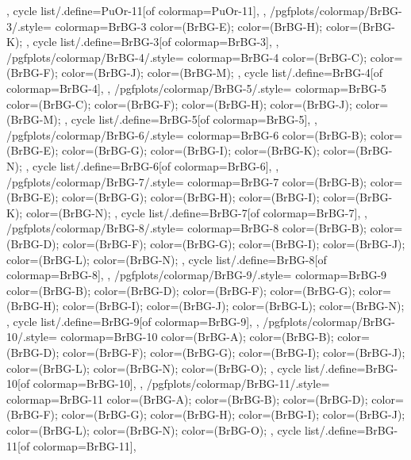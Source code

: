 {{{    },
    cycle list/.define={PuOr-11}{[of colormap=PuOr-11]},
  },
  /pgfplots/colormap/BrBG-3/.style={
    colormap={BrBG-3}{
      color=(BrBG-E);
      color=(BrBG-H);
      color=(BrBG-K);
    },
    cycle list/.define={BrBG-3}{[of colormap=BrBG-3]},
  },
  /pgfplots/colormap/BrBG-4/.style={
    colormap={BrBG-4}{
      color=(BrBG-C);
      color=(BrBG-F);
      color=(BrBG-J);
      color=(BrBG-M);
    },
    cycle list/.define={BrBG-4}{[of colormap=BrBG-4]},
  },
  /pgfplots/colormap/BrBG-5/.style={
    colormap={BrBG-5}{
      color=(BrBG-C);
      color=(BrBG-F);
      color=(BrBG-H);
      color=(BrBG-J);
      color=(BrBG-M);
    },
    cycle list/.define={BrBG-5}{[of colormap=BrBG-5]},
  },
  /pgfplots/colormap/BrBG-6/.style={
    colormap={BrBG-6}{
      color=(BrBG-B);
      color=(BrBG-E);
      color=(BrBG-G);
      color=(BrBG-I);
      color=(BrBG-K);
      color=(BrBG-N);
    },
    cycle list/.define={BrBG-6}{[of colormap=BrBG-6]},
  },
  /pgfplots/colormap/BrBG-7/.style={
    colormap={BrBG-7}{
      color=(BrBG-B);
      color=(BrBG-E);
      color=(BrBG-G);
      color=(BrBG-H);
      color=(BrBG-I);
      color=(BrBG-K);
      color=(BrBG-N);
    },
    cycle list/.define={BrBG-7}{[of colormap=BrBG-7]},
  },
  /pgfplots/colormap/BrBG-8/.style={
    colormap={BrBG-8}{
      color=(BrBG-B);
      color=(BrBG-D);
      color=(BrBG-F);
      color=(BrBG-G);
      color=(BrBG-I);
      color=(BrBG-J);
      color=(BrBG-L);
      color=(BrBG-N);
    },
    cycle list/.define={BrBG-8}{[of colormap=BrBG-8]},
  },
  /pgfplots/colormap/BrBG-9/.style={
    colormap={BrBG-9}{
      color=(BrBG-B);
      color=(BrBG-D);
      color=(BrBG-F);
      color=(BrBG-G);
      color=(BrBG-H);
      color=(BrBG-I);
      color=(BrBG-J);
      color=(BrBG-L);
      color=(BrBG-N);
    },
    cycle list/.define={BrBG-9}{[of colormap=BrBG-9]},
  },
  /pgfplots/colormap/BrBG-10/.style={
    colormap={BrBG-10}{
      color=(BrBG-A);
      color=(BrBG-B);
      color=(BrBG-D);
      color=(BrBG-F);
      color=(BrBG-G);
      color=(BrBG-I);
      color=(BrBG-J);
      color=(BrBG-L);
      color=(BrBG-N);
      color=(BrBG-O);
    },
    cycle list/.define={BrBG-10}{[of colormap=BrBG-10]},
  },
  /pgfplots/colormap/BrBG-11/.style={
    colormap={BrBG-11}{
      color=(BrBG-A);
      color=(BrBG-B);
      color=(BrBG-D);
      color=(BrBG-F);
      color=(BrBG-G);
      color=(BrBG-H);
      color=(BrBG-I);
      color=(BrBG-J);
      color=(BrBG-L);
      color=(BrBG-N);
      color=(BrBG-O);
    },
    cycle list/.define={BrBG-11}{[of colormap=BrBG-11]},
}}
